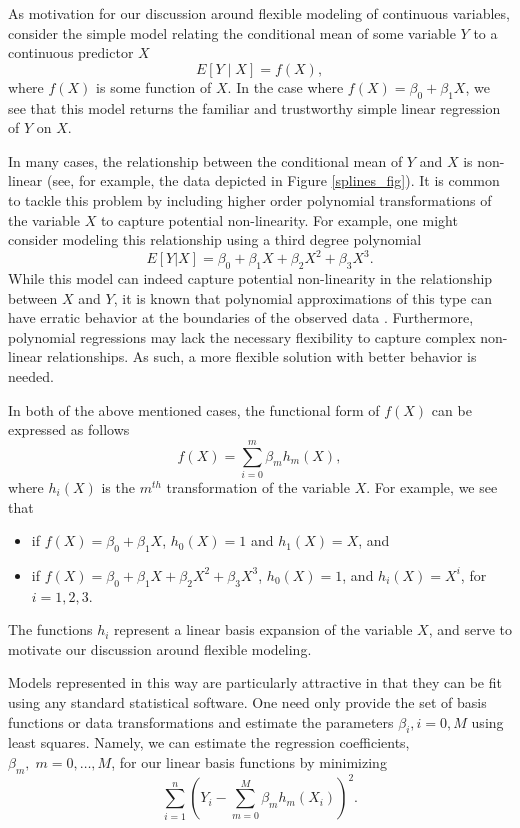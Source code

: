 As motivation for our discussion around flexible modeling of
continuous variables, consider the simple model relating the
conditional mean of some variable $Y$ to a continuous predictor $X$
	\[E[Y \mid X] = f(X),\]
where $f(X)$ is some function of $X$. In the case where $f(X) =
\beta_0 + \beta_1 X$, we see that this model returns the familiar and
trustworthy simple linear regression of $Y$ on $X$.

In many cases, the relationship between the conditional mean of $Y$
and $X$ is non-linear (see, for example, the data depicted in Figure
\ref{splines_fig}). It is common to tackle this problem by including
higher order polynomial transformations of the variable $X$ to capture
potential non-linearity. For example, one might consider modeling this
relationship using a third degree polynomial
	\[E[Y|X] = \beta_0 + \beta_1 X + \beta_2 X^2 + \beta_3 X^3.\]
While this model can indeed capture potential non-linearity in the
relationship between $X$ and $Y$, it is known that polynomial
approximations of this type can have erratic behavior at the
boundaries of the observed data \cite{ESL}. Furthermore, polynomial
regressions may lack the necessary flexibility to capture complex
non-linear relationships. As such, a more flexible solution with
better behavior is needed.

In both of the above mentioned cases, the functional form of $f(X)$
can be expressed as follows
	\[f(X) = \sum_{i=0}^m\beta_m h_m(X),\]
where $h_i(X)$ is the $m^{th}$ transformation of the variable $X$. For
example, we see that
	\begin{itemize}
		\item if $f(X) = \beta_0 + \beta_1 X$, $h_0(X)=1$ and $h_1(X) = X$, and
		\item if $f(X) = \beta_0 + \beta_1 X + \beta_2 X^2 + \beta_3 X^3$, $h_0(X) = 1$, and $h_i(X) = X^i$, for $i=1,2,3$.
	\end{itemize}
The functions $h_i$ represent a linear basis expansion of the variable
$X$, and serve to motivate our discussion around flexible modeling.

Models represented in this way are particularly attractive in that
they can be fit using any standard statistical software. One need only
provide the set of basis functions or data transformations and
estimate the parameters $\beta_i, i=0, M$ using least squares. Namely,
we can estimate the regression coefficients, $\beta_m,\; m=0, \dots,
M$, for our linear basis functions by minimizing
	\[\sum_{i=1}^n \left(Y_i - \sum_{m=0}^M \beta_mh_m(X_i)\right)^2.\]

